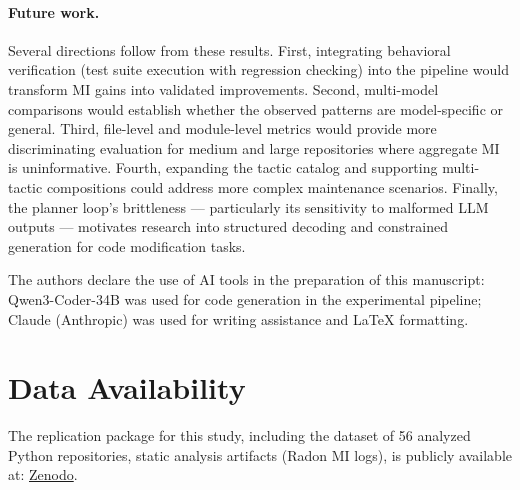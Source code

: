\documentclass[sigconf,review,anonymous]{acmart}
\begin{document}
\paragraph{Future work.}
Several directions follow from these results. First, integrating behavioral verification (test suite execution with regression checking) into the pipeline would transform MI gains into validated improvements. Second, multi-model comparisons would establish whether the observed patterns are model-specific or general. Third, file-level and module-level metrics would provide more discriminating evaluation for medium and large repositories where aggregate MI is uninformative. Fourth, expanding the tactic catalog and supporting multi-tactic compositions could address more complex maintenance scenarios. Finally, the planner loop's brittleness — particularly its sensitivity to malformed LLM outputs — motivates research into structured decoding and constrained generation for code modification tasks.

\begin{acks}
The authors declare the use of AI tools in the preparation of this manuscript: Qwen3-Coder-34B was used for code generation in the experimental pipeline; Claude (Anthropic) was used for writing assistance and LaTeX formatting.
\end{acks}

\section*{Data Availability}

The replication package for this study, including the dataset of 56 analyzed Python repositories, static analysis artifacts (Radon MI logs), is publicly available at: \href{https://zenodo.org/records/20547119?token=eyJhbGciOiJIUzUxMiJ9.eyJpZCI6ImI0MmIzODE2LTMzMjgtNGRlYi1hNzA3LWVkMzlkMjhmZDg5NSIsImRhdGEiOnt9LCJyYW5kb20iOiI5NTIxZTg5YmIxZmM0ZGJmNGYwMzQzZDBkODk5NjY0OSJ9.P260LQG5q0QhuY-KJ7rkhC5Pq0Xpnu5ywdNOCWq2PuVqB0g3l0s8o3M6PhZJFBNEpGGjJRoAx4oZ351grRPyCw}{Zenodo}.

\end{document}
